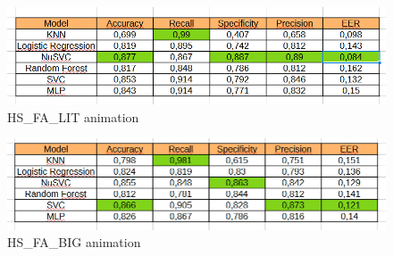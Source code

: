 \documentclass{article}
\begin{document}
\begin{figure}[ht]
    \centering
    \includegraphics[width = 0.8
    \textwidth]{Images/Results/Verification_single/st/HS_FA_LIT.png}
    \caption{HS\_FA\_LIT animation}
    \label{fig:HS_FA_LIT_st}
\end{figure}

\begin{figure}[ht]
    \centering
    \includegraphics[width = 0.8
    \textwidth]{Images/Results/Verification_single/st/HS_FA_BIG.png}
    \caption{HS\_FA\_BIG animation}
    \label{fig:HS_FA_BIG_st}
\end{figure}


\clearpage
\end{document}
